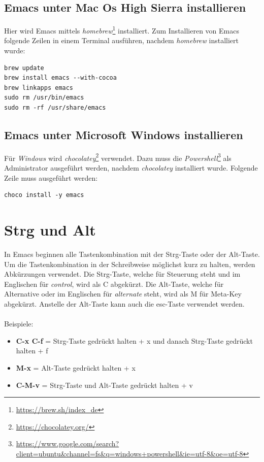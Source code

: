\subsection{Emacs unter Mac Os High Sierra installieren}
Hier wird Emacs mittels
\textit{homebrew}\footnote{\url{https://brew.sh/index_de}}
installiert. Zum Installieren von Emacs folgende Zeilen in einem
Terminal ausführen, nachdem \textit{homebrew} installiert wurde:
\begin{lstlisting}
brew update
brew install emacs --with-cocoa
brew linkapps emacs
sudo rm /usr/bin/emacs
sudo rm -rf /usr/share/emacs
\end{lstlisting}

\subsection{Emacs unter Microsoft Windows installieren}
Für \textit{Windows} wird
\textit{chocolatey}\footnote{\url{https://chocolatey.org/}}
verwendet. Dazu muss die
\textit{Powershell}\footnote{\url{https://www.google.com/search?client=ubuntu&channel=fs&q=windows+powershell&ie=utf-8&oe=utf-8}}
als Administrator ausgeführt werden, nachdem \textit{chocolatey}
installiert wurde. Folgende Zeile muss ausgeführt werden:
\begin{lstlisting}
choco install -y emacs
\end{lstlisting}

\section{Strg und Alt}
In Emacs beginnen alle Tastenkombination mit der Strg-Taste oder der
Alt-Taste. Um die Tastenkombination in der Schreibweise möglichst kurz
zu halten, werden Abkürzungen verwendet. Die Strg-Taste, welche für
Steuerung steht und im Englischen für \textit{control}, wird als
{\glqq}C{\grqq} abgekürzt. Die Alt-Taste, welche für Alternative oder
im Englischen für \textit{alternate} steht, wird als {\glqq}M{\grqq}
für {\glqq}Meta-Key{\grqq} abgekürzt. Anstelle der Alt-Taste kann auch
die esc-Taste verwendet werden. \cite{Hahn2016}\\\\ Beispiele:
\begin{itemize}
\item \textbf{C-x C-f} = Strg-Taste gedrückt halten + x und danach
  Strg-Taste gedrückt halten + f
\item \textbf{M-x} = Alt-Taste gedrückt halten + x
\item \textbf{C-M-v} = Strg-Taste und Alt-Taste gedrückt halten + v\\
\end{itemize}

